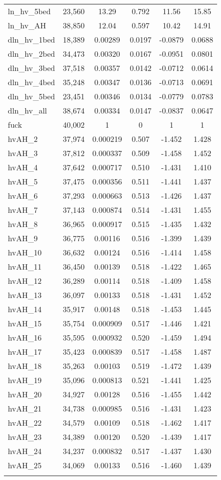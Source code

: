 \begin{tabular}{lccccc}
ln\_hv\_5bed & 23,560 & 13.29 & 0.792 & 11.56 & 15.85 \\
ln\_hv\_AH & 38,850 & 12.04 & 0.597 & 10.42 & 14.91 \\
dln\_hv\_1bed & 18,389 & 0.00289 & 0.0197 & -0.0879 & 0.0688 \\
dln\_hv\_2bed & 34,473 & 0.00320 & 0.0167 & -0.0951 & 0.0801 \\
dln\_hv\_3bed & 37,518 & 0.00357 & 0.0142 & -0.0712 & 0.0614 \\
dln\_hv\_4bed & 35,248 & 0.00347 & 0.0136 & -0.0713 & 0.0691 \\
dln\_hv\_5bed & 23,451 & 0.00346 & 0.0134 & -0.0779 & 0.0783 \\
dln\_hv\_all & 38,674 & 0.00334 & 0.0147 & -0.0837 & 0.0647 \\
fuck & 40,002 & 1 & 0 & 1 & 1 \\
hvAH\_2 & 37,974 & 0.000219 & 0.507 & -1.452 & 1.428 \\
hvAH\_3 & 37,812 & 0.000337 & 0.509 & -1.458 & 1.452 \\
hvAH\_4 & 37,642 & 0.000717 & 0.510 & -1.431 & 1.410 \\
hvAH\_5 & 37,475 & 0.000356 & 0.511 & -1.441 & 1.437 \\
hvAH\_6 & 37,293 & 0.000663 & 0.513 & -1.426 & 1.437 \\
hvAH\_7 & 37,143 & 0.000874 & 0.514 & -1.431 & 1.455 \\
hvAH\_8 & 36,965 & 0.000917 & 0.515 & -1.435 & 1.432 \\
hvAH\_9 & 36,775 & 0.00116 & 0.516 & -1.399 & 1.439 \\
hvAH\_10 & 36,632 & 0.00124 & 0.516 & -1.414 & 1.458 \\
hvAH\_11 & 36,450 & 0.00139 & 0.518 & -1.422 & 1.465 \\
hvAH\_12 & 36,289 & 0.00114 & 0.518 & -1.409 & 1.458 \\
hvAH\_13 & 36,097 & 0.00133 & 0.518 & -1.431 & 1.452 \\
hvAH\_14 & 35,917 & 0.00148 & 0.518 & -1.453 & 1.445 \\
hvAH\_15 & 35,754 & 0.000909 & 0.517 & -1.446 & 1.421 \\
hvAH\_16 & 35,595 & 0.000932 & 0.520 & -1.459 & 1.494 \\
hvAH\_17 & 35,423 & 0.000839 & 0.517 & -1.458 & 1.487 \\
hvAH\_18 & 35,263 & 0.00103 & 0.519 & -1.472 & 1.439 \\
hvAH\_19 & 35,096 & 0.000813 & 0.521 & -1.441 & 1.425 \\
hvAH\_20 & 34,927 & 0.00128 & 0.516 & -1.455 & 1.442 \\
hvAH\_21 & 34,738 & 0.000985 & 0.516 & -1.431 & 1.423 \\
hvAH\_22 & 34,579 & 0.00109 & 0.518 & -1.462 & 1.417 \\
hvAH\_23 & 34,389 & 0.00120 & 0.520 & -1.439 & 1.417 \\
hvAH\_24 & 34,237 & 0.000832 & 0.517 & -1.437 & 1.430 \\
hvAH\_25 & 34,069 & 0.00133 & 0.516 & -1.460 & 1.439 \\
 &  &  &  &  &  \\ \hline
\end{tabular}
